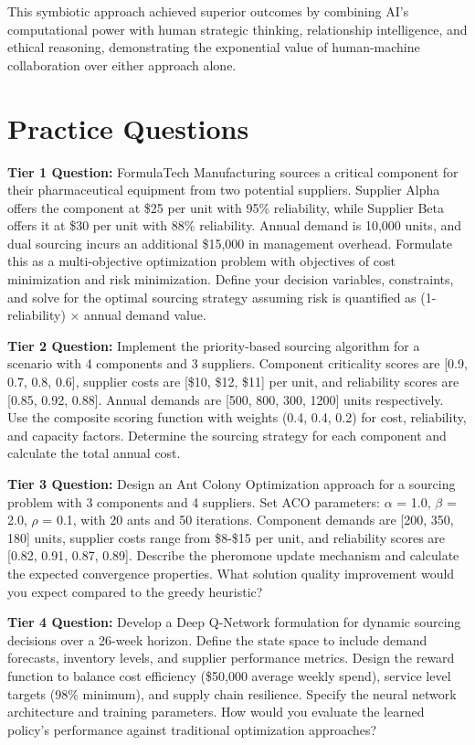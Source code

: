 \documentclass{article}
\begin{document}
This symbiotic approach achieved superior outcomes by combining AI's computational power with human strategic thinking, relationship intelligence, and ethical reasoning, demonstrating the exponential value of human-machine collaboration over either approach alone.

\section{Practice Questions}

\textbf{Tier 1 Question:}
FormulaTech Manufacturing sources a critical component for their pharmaceutical equipment from two potential suppliers. Supplier Alpha offers the component at \$25 per unit with 95\% reliability, while Supplier Beta offers it at \$30 per unit with 88\% reliability. Annual demand is 10,000 units, and dual sourcing incurs an additional \$15,000 in management overhead. Formulate this as a multi-objective optimization problem with objectives of cost minimization and risk minimization. Define your decision variables, constraints, and solve for the optimal sourcing strategy assuming risk is quantified as (1-reliability) × annual demand value.

\textbf{Tier 2 Question:}
Implement the priority-based sourcing algorithm for a scenario with 4 components and 3 suppliers. Component criticality scores are [0.9, 0.7, 0.8, 0.6], supplier costs are [\$10, \$12, \$11] per unit, and reliability scores are [0.85, 0.92, 0.88]. Annual demands are [500, 800, 300, 1200] units respectively. Use the composite scoring function with weights (0.4, 0.4, 0.2) for cost, reliability, and capacity factors. Determine the sourcing strategy for each component and calculate the total annual cost.

\textbf{Tier 3 Question:}
Design an Ant Colony Optimization approach for a sourcing problem with 3 components and 4 suppliers. Set ACO parameters: $\alpha$ = 1.0, $\beta$ = 2.0, $\rho$ = 0.1, with 20 ants and 50 iterations. Component demands are [200, 350, 180] units, supplier costs range from \$8-\$15 per unit, and reliability scores are [0.82, 0.91, 0.87, 0.89]. Describe the pheromone update mechanism and calculate the expected convergence properties. What solution quality improvement would you expect compared to the greedy heuristic?

\textbf{Tier 4 Question:}
Develop a Deep Q-Network formulation for dynamic sourcing decisions over a 26-week horizon. Define the state space to include demand forecasts, inventory levels, and supplier performance metrics. Design the reward function to balance cost efficiency (\$50,000 average weekly spend), service level targets (98\% minimum), and supply chain resilience. Specify the neural network architecture and training parameters. How would you evaluate the learned policy's performance against traditional optimization approaches?
\end{document}
